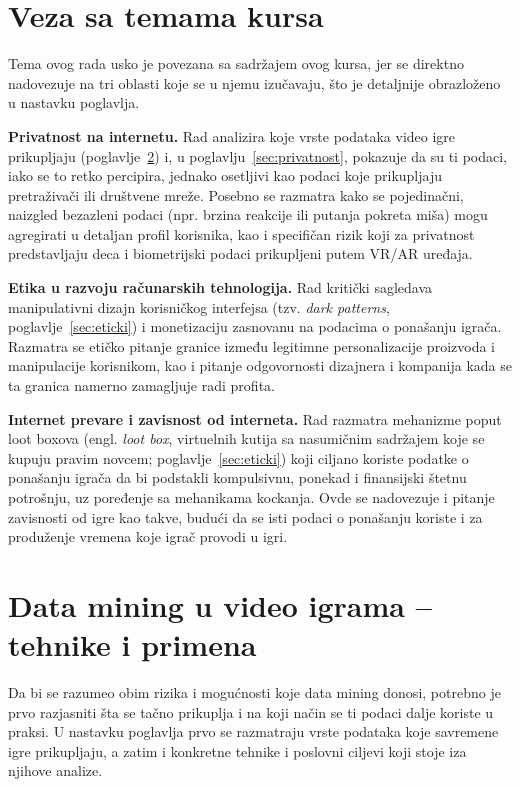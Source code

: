 \documentclass[12pt]{article}
\begin{document}
\section{Veza sa temama kursa}

Tema ovog rada usko je povezana sa sadržajem ovog kursa, jer se direktno nadovezuje na tri oblasti koje se u njemu izučavaju, što je detaljnije obrazloženo u nastavku poglavlja.

\textbf{Privatnost na internetu.} Rad analizira koje vrste podataka video igre prikupljaju (poglavlje~\ref{sec:tehnike}) i, u poglavlju~\ref{sec:privatnost}, pokazuje da su ti podaci, iako se to retko percipira, jednako osetljivi kao podaci koje prikupljaju pretraživači ili društvene mreže. Posebno se razmatra kako se pojedinačni, naizgled bezazleni podaci (npr. brzina reakcije ili putanja pokreta miša) mogu agregirati u detaljan profil korisnika, kao i specifičan rizik koji za privatnost predstavljaju deca i biometrijski podaci prikupljeni putem VR/AR uređaja.

\textbf{Etika u razvoju računarskih tehnologija.} Rad kritički sagledava manipulativni dizajn korisničkog interfejsa (tzv. \textit{dark patterns}, poglavlje~\ref{sec:eticki}) i monetizaciju zasnovanu na podacima o ponašanju igrača. Razmatra se etičko pitanje granice između legitimne personalizacije proizvoda i manipulacije korisnikom, kao i pitanje odgovornosti dizajnera i kompanija kada se ta granica namerno zamagljuje radi profita.

\textbf{Internet prevare i zavisnost od interneta.} Rad razmatra mehanizme poput loot boxova (engl. \textit{loot box}, virtuelnih kutija sa nasumičnim sadržajem koje se kupuju pravim novcem; poglavlje~\ref{sec:eticki}) koji ciljano koriste podatke o ponašanju igrača da bi podstakli kompulsivnu, ponekad i finansijski štetnu potrošnju, uz poređenje sa mehanikama kockanja. Ovde se nadovezuje i pitanje zavisnosti od igre kao takve, budući da se isti podaci o ponašanju koriste i za produženje vremena koje igrač provodi u igri.

\section{Data mining u video igrama -- tehnike i primena}\label{sec:tehnike}

Da bi se razumeo obim rizika i mogućnosti koje data mining donosi, potrebno je prvo razjasniti šta se tačno prikuplja i na koji način se ti podaci dalje koriste u praksi. U nastavku poglavlja prvo se razmatraju vrste podataka koje savremene igre prikupljaju, a zatim i konkretne tehnike i poslovni ciljevi koji stoje iza njihove analize.
\end{document}
